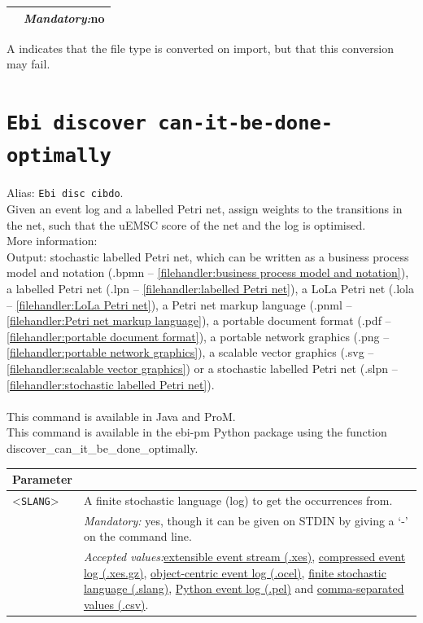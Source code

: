{\begin{tabularx}{\linewidth}{lX}
&\textit{Mandatory:}\quad no\\
\bottomrule
\end{tabularx}
A \textdagger{} indicates that the file type is converted on import, but that this conversion may fail.
\clearpage\section{\texttt{Ebi discover can-it-be-done-optimally}}
\label{command:Ebi discover can-it-be-done-optimally}
Alias: \texttt{Ebi disc cibdo}.\\
Given an event log and a labelled Petri net, assign weights to the transitions in the net, such that the uEMSC score of the net and the log is optimised.\\
More information: ~\cite{DBLP:conf/caise/LeemansLMP24}~\\
\noindent Output: stochastic labelled Petri net, which can be written as a business process model and notation (.bpmn -- \cref{filehandler:business process model and notation}), a labelled Petri net (.lpn -- \cref{filehandler:labelled Petri net}), a LoLa Petri net (.lola -- \cref{filehandler:LoLa Petri net}), a Petri net markup language (.pnml -- \cref{filehandler:Petri net markup language}), a portable document format (.pdf -- \cref{filehandler:portable document format}), a portable network graphics (.png -- \cref{filehandler:portable network graphics}), a scalable vector graphics (.svg -- \cref{filehandler:scalable vector graphics}) or a stochastic labelled Petri net (.slpn -- \cref{filehandler:stochastic labelled Petri net}).\\
\\This command is available in Java and ProM.
\\This command is available in the ebi-pm Python package using the function discover\_can\_it\_be\_done\_optimally.
\begin{tabularx}{\linewidth}{lX}
\toprule
Parameter \\\midrule
<\texttt{SLANG}>&A finite stochastic language (log) to get the occurrences from.\\
&\textit{Mandatory:} \quad yes, though it can be given on STDIN by giving a `-' on the command line.\\
&\textit{Accepted values:}\quad \hyperref[filehandler:extensible event stream]{extensible event stream (.xes)}, \hyperref[filehandler:compressed event log]{compressed event log (.xes.gz)}, \hyperref[filehandler:object-centric event log]{object-centric event log (.ocel)}, \hyperref[filehandler:finite stochastic language]{finite stochastic language (.slang)}, \hyperref[filehandler:Python event log]{Python event log (.pel)} and \hyperref[filehandler:comma-separated values]{comma-separated values (.csv)}.\\

\end{tabularx}}

